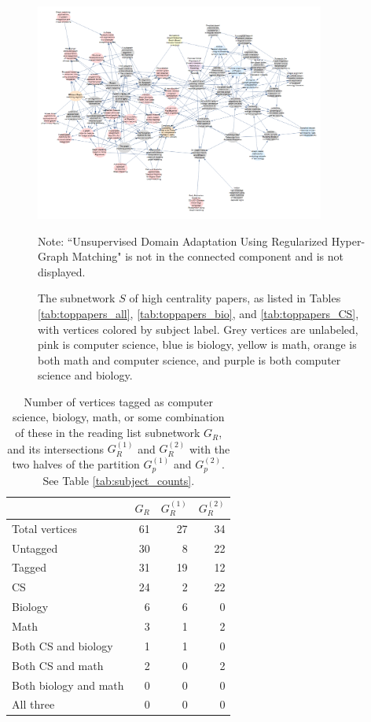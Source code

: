 \documentclass[12pt]{thesis}
\theoremstyle{plain}
\theoremstyle{definition}
\theoremstyle{remark}
\begin{document}
\begin{figure}
\centering
\includegraphics[width=0.85\textwidth]{reading_list_subject_colored_CROPPED.png}
\caption{The subnetwork $S$ of high centrality papers, as listed in Tables \ref{tab:toppapers_all}, \ref{tab:toppapers_bio}, and \ref{tab:toppapers_CS}, with vertices colored by subject label. Grey vertices are unlabeled, pink is computer science, blue is biology, yellow is math, orange is both math and computer science, and purple is both computer science and biology.}
\vspace{-12pt}\flushleft\scriptsize Note: ``Unsupervised Domain Adaptation Using Regularized Hyper-Graph Matching" is not in the connected component and is not displayed.
\label{fig:reading_list_subject_colored}
\end{figure}


\begin{table}[t]
\centering
\setlength\extrarowheight{3pt}
\begin{tabular}{|l|r|r|r|}
\hline & $G_R$ & $G_R^{(1)}$ & $G_R^{(2)}$ \\ \hline\hline
Total vertices & 61 & 27 & 34 \\ \hline
Untagged & 30 & 8 & 22 \\ \hline
Tagged & 31 & 19 & 12 \\ \hline
CS & 24 & 2 & 22 \\ \hline
Biology & 6 & 6 & 0 \\ \hline
Math & 3 & 1 & 2 \\ \hline
Both CS and biology & 1 & 1 & 0 \\ \hline
Both CS and math & 2 & 0 & 2 \\ \hline
Both biology and math & 0 & 0 & 0 \\ \hline
All three & 0 & 0 & 0 \\ \hline
\end{tabular}
\caption{Number of vertices tagged as computer science, biology, math, or some combination of these in the reading list subnetwork $G_R$, and its intersections $G_R^{(1)}$ and $G_R^{(2)}$ with the two halves of the partition $G_p^{(1)}$ and $G_p^{(2)}$. See Table \ref{tab:subject_counts}.}
\label{tab:reading_list_subject_counts}
\end{table}
\end{document}

